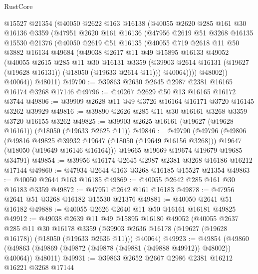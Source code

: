 \begin{lexlean}{RustCore}
\begin{coremodule}
      @15527
      @21354
      (@40050
        @2622
        @163
        @16138
        (@40055
          @2620
          @285
          @161
          @30
          @16136
          @3359
          (@47951
            @2620
            @161
            @16136
            (@47956
              @2619
              @51
              @3268
              @16135
              @15530
              @21376
              (@40050
                @2619
                @51
                @16135
                (@40055
                  @719
                  @2618
                  @11
                  @50
                  @3882
                  @16134
                  @49684
                  (@49038
                    @2617
                    @11
                    @49
                    @15895
                    @16133
                    @49052
                    (@40055
                      @2615
                      @285
                      @11
                      @30
                      @16131
                      @3359
                      (@39903 @2614 @16131 (@19627 (@19628 @16131)) (@18050 (@19633 @2614 @11)))
                      @40064))))
              @48002))
          @40064))
      @48011)
@49790 := @39863 @2630 @2645 @2987 @2381 @16165 @16174 @3268 @17146
@49796 := @40267 @2629 @50 @13 @16165 @16172 @3744
@49806 := @39909 @2628 @11 @49 @3726 @16164 @16171 @3720 @16145 @3262 @39929
@49816 := @39890 @2626 @285 @11 @30 @16161 @3268 @3359 @3720 @16155 @3262
@49825 := @39903 @2625 @16161 (@19627 (@19628 @16161)) (@18050 (@19633 @2625 @11))
@49846 := @49790
    (@49796
      (@49806
        (@49816 @49825 @39932 @19647 (@18050 (@19649 @16156 @3268)))
        @19647
        (@18050 (@19649 @16146 @16164)))
      @19665
      @19669
      @19674
      @19679
      @19685
      @34791)
@49854 := @39956 @16174 @2645 @2987 @2381 @3268 @16186 @16212 @17144
@49860 := @47934 @2644 @163 @3268 @16185 @15527 @21354
@49863 := @40050 @2644 @163 @16185
@49869 := @40055 @2642 @285 @161 @30 @16183 @3359
@49872 := @47951 @2642 @161 @16183
@49878 := @47956 @2641 @51 @3268 @16182 @15530 @21376
@49881 := @40050 @2641 @51 @16182
@49888 := @40055 @2626 @2640 @11 @50 @16161 @16181 @49825
@49912 := @49038
    @2639
    @11
    @49
    @15895
    @16180
    @49052
    (@40055
      @2637
      @285
      @11
      @30
      @16178
      @3359
      (@39903 @2636 @16178 (@19627 (@19628 @16178)) (@18050 (@19633 @2636 @11)))
      @40064)
@49923 := @49854
    (@49860 (@49863 (@49869 (@49872 (@49878 (@49881 (@49888 @49912)) @48002)) @40064)) @48011)
@49931 := @39863 @2652 @2667 @2986 @2381 @16212 @16221 @3268 @17144

\end{coremodule}
\end{lexlean}

